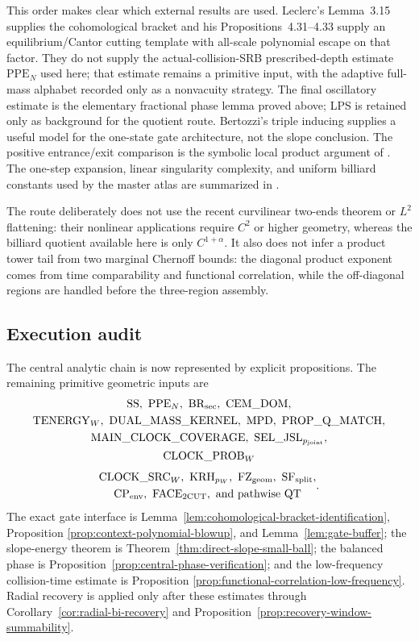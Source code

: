 \documentclass[11pt]{article}
\begin{document}
This order makes clear which external results are used.  Leclerc's
Lemma~3.15 supplies the cohomological bracket and his
Propositions~4.31--4.33 supply an equilibrium/Cantor cutting template with
all-scale polynomial escape on that factor.  They do not supply the
actual-collision-SRB prescribed-depth estimate $\mathrm{PPE}_{N}$ used here;
that estimate remains a primitive input, with the adaptive full-mass alphabet
recorded only as a nonvacuity strategy.
The final oscillatory estimate is the elementary fractional phase lemma
proved above; LPS is retained only as background for the quotient route.
Bertozzi's triple inducing supplies a useful model for the one-state gate
architecture, not the slope conclusion.  The positive entrance/exit comparison is the symbolic local
product argument of \cite{ClimenhagaLPS}.  The
one-step expansion, linear singularity complexity, and uniform billiard
constants used by the master atlas are summarized in \cite{DLreview}.

The route deliberately does not use the recent curvilinear two-ends theorem
or $L^2$ flattening: their nonlinear applications require $C^2$ or higher
geometry, whereas the billiard quotient available here is only
$C^{1+\alpha}$.  It also does not infer a product tower tail from two
marginal Chernoff bounds: the diagonal product exponent comes from time
comparability and functional correlation, while the off-diagonal regions are
handled before the three-region assembly.

\subsection{Execution audit}

The central analytic chain is now represented by explicit propositions.
The remaining primitive geometric inputs are
\[
 \begin{gathered}
 \mathrm{SS},\ \mathrm{PPE}_{N},\ \mathrm{BR}_{\rm sec},\
 \mathrm{CEM\_DOM},\\
 \mathrm{TENERGY}_{W},\ \mathrm{DUAL\_MASS\_KERNEL},\ \mathrm{MPD},\
 \mathrm{PROP\_Q\_MATCH},\\
 \mathrm{MAIN\_CLOCK\_COVERAGE},\
 \mathrm{SEL\_JSL}_{p_{\rm joint}},\\
 \mathrm{CLOCK\_PROB}_{W}
 \end{gathered}
\]
\[
 \begin{gathered}
 \mathrm{CLOCK\_SRC}_{W},\ \mathrm{KRH}_{p_W},\
 \mathrm{FZ}_{\rm geom},\ \mathrm{SF}_{\rm split},\\
 \mathrm{CP}_{\rm env},\ \mathrm{FACE}_{\rm 2CUT},\
 \text{and pathwise }\mathrm{QT}
 \end{gathered}.
\]
The exact gate interface is
Lemma~\ref{lem:cohomological-bracket-identification}, Proposition
\ref{prop:context-polynomial-blowup}, and Lemma~\ref{lem:gate-buffer}; the
slope-energy theorem is Theorem~\ref{thm:direct-slope-small-ball}; the
balanced phase is Proposition~\ref{prop:central-phase-verification}; and the
low-frequency collision-time estimate is Proposition
\ref{prop:functional-correlation-low-frequency}.  Radial recovery is applied
only after these estimates through Corollary~\ref{cor:radial-bi-recovery} and
Proposition~\ref{prop:recovery-window-summability}.
\end{document}

